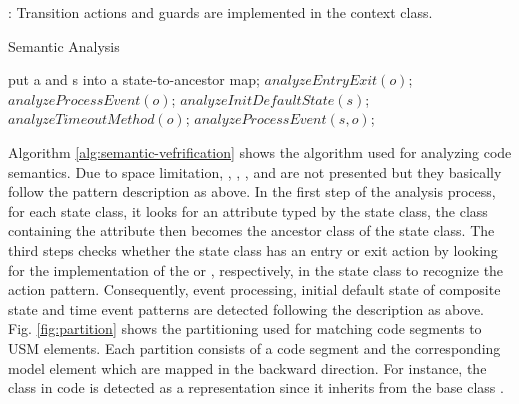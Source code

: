 \noindent
{}: Transition actions and guards are implemented in the context class.

\begin{algorithm}[]
  \caption{Semantic Analysis
    \label{alg:semantic-vefrification}}
  \begin{algorithmic}[1]
        			\State put a and s into a state-to-ancestor map;
        		\EndIf
        	\EndFor
        			\State $analyzeEntryExit(o)$; 	
        			\State $analyzeProcessEvent(o)$;
        			\State $analyzeInitDefaultState(s)$;
        			\State $analyzeTimeoutMethod(o)$;
        			\State $analyzeProcessEvent(s,o)$;
        		\EndIf	
        	\EndFor
    	\EndFor
  \end{algorithmic}
\end{algorithm}

Algorithm \ref{alg:semantic-vefrification} shows the algorithm used for analyzing code semantics. Due to space limitation, , , ,  and  are not presented but they basically follow the pattern description as above. In the first step of the analysis process, for each state class, it looks for an attribute typed by the state class, the class containing the attribute then becomes the ancestor class of the state class. The third steps checks whether the state class has an entry or exit action by looking for the implementation of the  or , respectively, in the state class to recognize the  action pattern. Consequently, event processing, initial default state of composite state and time event patterns are detected following the description as above.  Fig. \ref{fig:partition} shows the partitioning used for matching code segments to USM elements. Each partition consists of a code segment and the corresponding model element which are mapped in the backward direction. For instance, the  class in code is detected as a representation since it inherits from the base class .  
 
